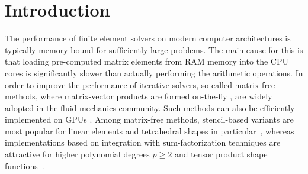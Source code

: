 \documentclass[AMA,STIX1COL]{WileyNJD-v2}
\begin{document}
\section{Introduction}

The performance of finite element solvers on modern computer architectures is typically memory bound for sufficiently large problems.
The main cause for this is that loading pre-computed matrix elements from RAM memory into the CPU cores is significantly slower than actually performing the arithmetic operations.
In order to improve the performance of iterative solvers, so-called matrix-free methods,
where matrix-vector products are formed on-the-fly \cite{Brown2010,kronbichler12,May2015, Krank2017,  Gmeiner2016},
are widely adopted in the fluid mechanics community.
Such methods can also be efficiently implemented on GPUs \cite{Abdelfattah2016, ljungkvist2017multigrid}.
{\color{red}
Among matrix-free methods, stencil-based variants are most popular for linear elements and tetrahedral shapes in particular~\cite{Gmeiner2016,Bauer2018}, whereas implementations based on integration with sum-factorization techniques are attractive for higher polynomial degrees $p\geq 2$ and tensor product shape functions~\cite{Brown2010,kronbichler12,May2015,Cantwell2011}.
}
\end{document}
